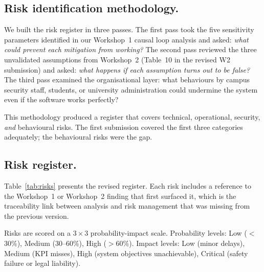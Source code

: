 \documentclass[12pt,a4paper]{article}
\begin{document}
\subsection{Risk identification methodology.}
We built the risk register in three passes. The first pass took the
five sensitivity parameters identified in our Workshop~1 causal loop
analysis and asked: \emph{what could prevent each mitigation from
working?} The second pass reviewed the three unvalidated
assumptions from Workshop~2 (Table~10 in the revised W2 submission)
and asked: \emph{what happens if each assumption turns out to be
false?} The third pass examined the organisational layer: what
behaviours by campus security staff, students, or university
administration could undermine the system even if the software
works perfectly?

This methodology produced a register that covers technical,
operational, security, \emph{and} behavioural risks. The first
submission covered the first three categories adequately; the
behavioural risks were the gap.

\subsection{Risk register.}
Table~\ref{tab:risks} presents the revised register. Each risk
includes a reference to the Workshop~1 or Workshop~2 finding that
first surfaced it, which is the traceability link between analysis
and risk management that was missing from the previous version.

Risks are scored on a $3\times3$ probability-impact scale.
Probability levels: Low ($<$30\%), Medium (30--60\%), High ($>$60\%).
Impact levels: Low (minor delays), Medium (KPI misses), High
(system objectives unachievable), Critical (safety failure or
legal liability).
\end{document}
